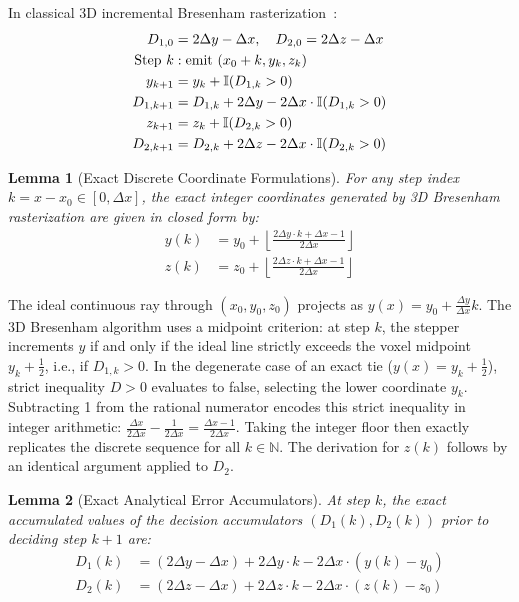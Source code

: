 \documentclass[conference]{IEEEtran}
\newtheorem{lemma}{Lemma}
\begin{document}
In classical 3D incremental Bresenham rasterization~\cite{bresenham1965algorithm}:
\begin{align}
    D_{1,0} &= 2\Delta y - \Delta x, \quad D_{2,0} = 2\Delta z - \Delta x \\
    \text{Step } k &: \text{emit } (x_0 + k, y_k, z_k) \notag \\
    y_{k+1} &= y_k + \mathbb{I}(D_{1,k} > 0) \notag \\
    D_{1,k+1} &= D_{1,k} + 2\Delta y - 2\Delta x \cdot \mathbb{I}(D_{1,k} > 0) \notag \\
    z_{k+1} &= z_k + \mathbb{I}(D_{2,k} > 0) \notag \\
    D_{2,k+1} &= D_{2,k} + 2\Delta z - 2\Delta x \cdot \mathbb{I}(D_{2,k} > 0) \notag
\end{align}

\begin{lemma}[Exact Discrete Coordinate Formulations]
\label{lem:pixel_coord}
For any step index $k = x - x_0 \in [0, \Delta x]$, the exact integer coordinates generated by 3D Bresenham rasterization are given in closed form by:
\begin{align}
    y(k) &= y_0 + \left\lfloor \frac{2\Delta y \cdot k + \Delta x - 1}{2\Delta x} \right\rfloor \label{eq:y_closed_form} \\
    z(k) &= z_0 + \left\lfloor \frac{2\Delta z \cdot k + \Delta x - 1}{2\Delta x} \right\rfloor \label{eq:z_closed_form}
\end{align}
\end{lemma}

\begin{IEEEproof}
The ideal continuous ray through $(x_0, y_0, z_0)$ projects as $y(x) = y_0 + \frac{\Delta y}{\Delta x}k$. The 3D Bresenham algorithm uses a midpoint criterion: at step $k$, the stepper increments $y$ if and only if the ideal line strictly exceeds the voxel midpoint $y_k + \frac{1}{2}$, i.e., if $D_{1,k} > 0$. In the degenerate case of an exact tie ($y(x) = y_k + \frac{1}{2}$), strict inequality $D > 0$ evaluates to false, selecting the lower coordinate $y_k$. Subtracting 1 from the rational numerator encodes this strict inequality in integer arithmetic: $\frac{\Delta x}{2\Delta x} - \frac{1}{2\Delta x} = \frac{\Delta x - 1}{2\Delta x}$. Taking the integer floor then exactly replicates the discrete sequence for all $k \in \mathbb{N}$. The derivation for $z(k)$ follows by an identical argument applied to $D_2$.
\end{IEEEproof}

\begin{lemma}[Exact Analytical Error Accumulators]
\label{lem:error_state}
At step $k$, the exact accumulated values of the decision accumulators $(D_1(k), D_2(k))$ prior to deciding step $k+1$ are:
\begin{align}
    D_1(k) &= (2\Delta y - \Delta x) + 2\Delta y \cdot k - 2\Delta x \cdot (y(k) - y_0) \label{eq:D1_closed_form} \\
    D_2(k) &= (2\Delta z - \Delta x) + 2\Delta z \cdot k - 2\Delta x \cdot (z(k) - z_0) \label{eq:D2_closed_form}
\end{align}
\end{lemma}
\end{document}
